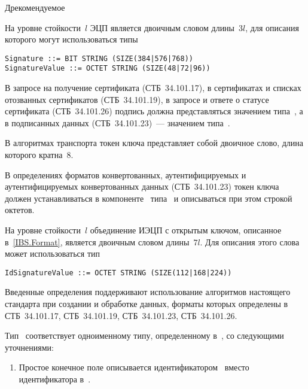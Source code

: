 \begin{appendix}{Д}{рекомендуемое}

\label{ASN.Sign}

На уровне стойкости~$l$ ЭЦП является двоичным словом длины~$3l$,
для описания которого могут использоваться типы
\begin{verbatim}
Signature ::= BIT STRING (SIZE(384|576|768))
SignatureValue ::= OCTET STRING (SIZE(48|72|96))
\end{verbatim}

В запросе на получение сертификата (СТБ~34.101.17),
в сертификатах и списках отозванных сертификатов (СТБ~34.101.19),
в запросе и ответе о статусе сертификата (СТБ~34.101.26)
подпись должна представляться значением типа~, 
а в подписанных данных (СТБ~34.101.23)~---
значением типа~.

\label{ASN.Token}

В алгоритмах транспорта 
токен ключа представляет собой двоичное слово, 
длина которого кратна~$8$.

В  определениях форматов конвертованных, аутентифицируемых 
и аутентифицируемых конвертованных данных (СТБ~34.101.23)
токен ключа должен устанавливаться 
в компоненте~ типа~
и описываться при этом строкой октетов.

\label{ASN.IBS}

На уровне стойкости~$l$ объединение ИЭЦП с открытым ключом,
описанное в~\ref{IBS.Format}, является двоичным словом длины~$7l$.
Для описания этого слова может использоваться тип
\begin{verbatim}
IdSignatureValue ::= OCTET STRING (SIZE(112|168|224))
\end{verbatim}

\label{ASN.Compat}

Введенные определения поддерживают использование алгоритмов 
настоящего стандарта при создании и обработке данных, 
форматы которых определены в СТБ~34.101.17, СТБ~34.101.19, 
СТБ~34.101.23, СТБ~34.101.26.

Тип~ соответствует одноименному типу,
определенному в~\cite{ANSI9.62}, со следующими уточнениями:
\begin{enumerate}
\item
Простое конечное поле описывается идентификатором~ 
вместо  идентификатора  в~\cite{ANSI9.62}.


\end{enumerate}
\end{appendix}
